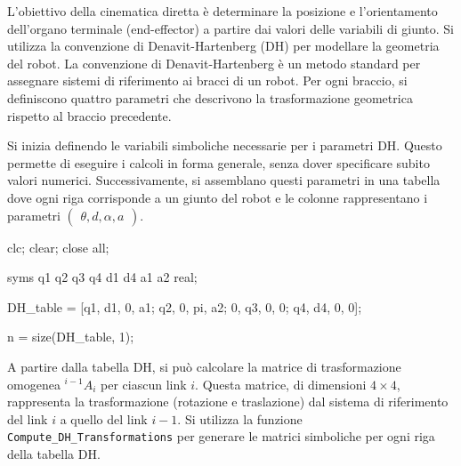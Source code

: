 \documentclass[11pt, a4paper]{article}
\begin{document}

\begin{par}
\begin{flushleft}
L'obiettivo della cinematica diretta è determinare la posizione e l'orientamento dell'organo terminale (end-effector) a partire dai valori delle variabili di giunto. Si utilizza la convenzione di Denavit-Hartenberg (DH) per modellare la geometria del robot. La convenzione di Denavit-Hartenberg è un metodo standard per assegnare sistemi di riferimento ai bracci di un robot. Per ogni braccio, si definiscono quattro parametri che descrivono la trasformazione geometrica rispetto al braccio precedente.
\end{flushleft}
\end{par}

\begin{par}
\begin{flushleft}
Si inizia definendo le variabili simboliche necessarie per i parametri DH. Questo permette di eseguire i calcoli in forma generale, senza dover specificare subito valori numerici. Successivamente, si assemblano questi parametri in una tabella dove ogni riga corrisponde a un giunto del robot e le colonne rappresentano i parametri $\left(\begin{array}{c}
\theta ,d,\alpha ,a
\end{array}\right)$.
\end{flushleft}
\end{par}

\begin{matlabcode}
clc;
clear;
close all;

syms q1 q2 q3 q4 d1 d4 a1 a2 real;

DH_table = [q1, d1, 0,  a1;
            q2, 0,  pi, a2;
            0,  q3, 0,  0;
            q4, d4, 0,  0];

n = size(DH_table, 1);
\end{matlabcode}

\begin{par}
\begin{flushleft}
A partire dalla tabella DH, si può calcolare la matrice di trasformazione omogenea $^{i-1}A_i$ per ciascun link $i$. Questa matrice, di dimensioni $4\times 4$, rappresenta la trasformazione (rotazione e traslazione) dal sistema di riferimento del link $i$ a quello del link $i-1$. Si utilizza la funzione \texttt{Compute\_DH\_Transformations} per generare le matrici simboliche per ogni riga della tabella DH.
\end{flushleft}
\end{par}
\end{document}

